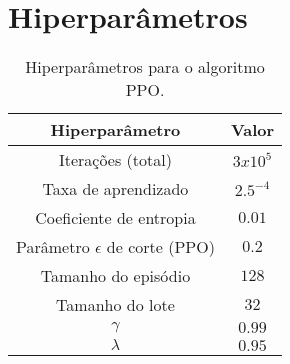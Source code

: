 \chapter{Hiperparâmetros}
\label{apend:1}

\begin{table*}[ht]
\centering
\caption{Hiperparâmetros para o algoritmo PPO.}
\label{tab:hiperparameters} 
\begin{tabular}{|c|c|}
\hline Hiperparâmetro & Valor \\
\hline Iterações (total) & $3x10^5$ \\
\hline Taxa de aprendizado & $2.5^{-4}$ \\
\hline Coeficiente de entropia & $0.01$ \\ 
\hline Parâmetro $\epsilon$ de corte (PPO) & $0.2$ \\
\hline Tamanho do episódio & $128$ \\ 
\hline Tamanho do lote & $32$ \\ 
\hline $\gamma$ & $0.99$ \\ 
\hline $\lambda$ & $0.95$ \\ 
\hline 
\end{tabular} 
\end{table*}